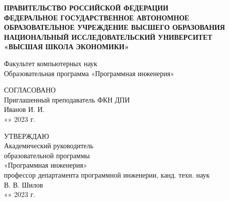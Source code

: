 \documentclass[12pt]{article}
\begin{document}
\thispagestyle{empty}
\begin{center}{
    \textbf{
        ПРАВИТЕЛЬСТВО РОССИЙСКОЙ ФЕДЕРАЦИИ \\
        ФЕДЕРАЛЬНОЕ ГОСУДАРСТВЕННОЕ АВТОНОМНОЕ \\ 
        ОБРАЗОВАТЕЛЬНОЕ УЧРЕЖДЕНИЕ ВЫСШЕГО ОБРАЗОВАНИЯ \\
        НАЦИОНАЛЬНЫЙ ИССЛЕДОВАТЕЛЬСКИЙ УНИВЕРСИТЕТ \\
        «ВЫСШАЯ ШКОЛА ЭКОНОМИКИ»
    }
}
\end{center}
\begin{center}
Факультет компьютерных наук \\
Образовательная программа «Программная инженерия»
\end{center}

\begin{minipage}{\textwidth}{
    \begin{multicols*}{2}{
        \begin{center}{
            СОГЛАСОВАНО \\ 
            Приглашенный преподаватель ФКН ДПИ \\
            \underline{\hspace{3cm}} Иванов И. И. \\
            «\underline{\hspace{0.5cm}}»\underline{\hspace{2cm}} 2023 г.
        }\end{center}
        \columnbreak
        \begin{center}{
            УТВЕРЖДАЮ \\ 
            Академический руководитель \\ образовательной программы \\ «Программная инженерия» \\ профессор департамента программной инженерии, канд. техн. наук \\
            \underline{\hspace{3cm}} В. В. Шилов \\ 
            «\underline{\hspace{0.5cm}}»\underline{\hspace{2cm}} 2023 г.
        }\end{center}
    }
\end{multicols*}
}
\end{minipage}
\\
\end{document}
